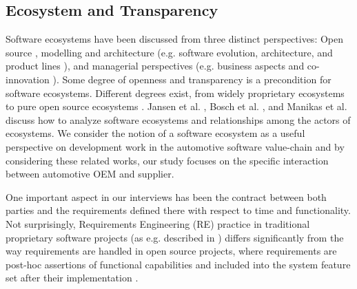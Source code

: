 \subsection{Ecosystem and Transparency}
Software ecosystems have been discussed from three distinct perspectives: Open source
\cite{Scacchi2009}, modelling and architecture (e.g. software evolution, architecture, and product lines \cite{Bosch2009}), and managerial perspectives (e.g. business aspects and co-innovation \cite{Jansen2012b}). 
Some degree of openness and transparency is a precondition for software ecosystems. Different degrees exist, from widely proprietary ecosystems to pure open source ecosystems \cite{Angeren2012,Jansen2012c}.
Jansen et al. \cite{Jansen2012a}, Bosch et al. \cite{Bosch2009}, and Manikas et al. \cite{Manikas2013b} discuss how to analyze software ecosystems and relationships among the actors of ecosystems. 
We consider the notion of a software ecosystem as a useful perspective on development work in the automotive software value-chain \cite{Knauss2014d} and by considering these related works, our study focuses on the specific interaction between automotive OEM and supplier.

One important aspect in our interviews has been the contract between both parties and the requirements defined there with respect to time and functionality. 
Not surprisingly, Requirements Engineering (RE) practice in traditional proprietary software projects (as e.g. described in \cite{Robertson1999,Ruhe2010}) differs significantly from the way requirements are handled in open source projects, where requirements are post-hoc assertions of functional capabilities and included into the system feature set after their implementation \cite{Scacchi2009}.


